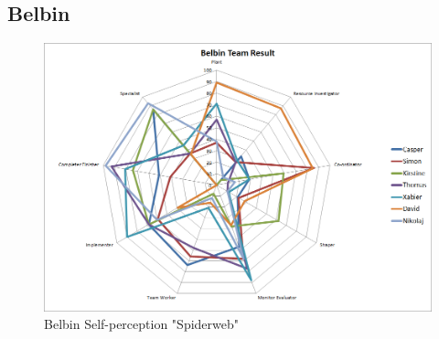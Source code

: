\subsection{Belbin}

\begin{figure} [h!]
\includegraphics[width=\textwidth]{./graphics/Belbin_spiderweb}
\caption{Belbin Self-perception "Spiderweb"}
\label{belbinspider}
\end{figure}

